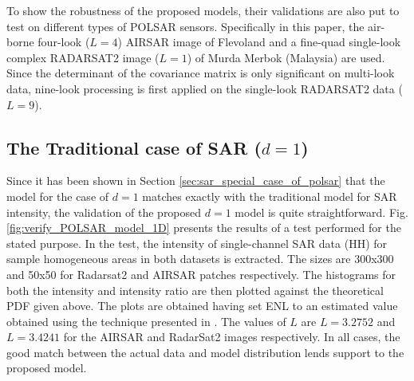\documentclass[journal]{IEEEtran}
\begin{document}
To show the robustness of the proposed models, 
  their validations are also put to test on different types of POLSAR sensors.
Specifically in this paper, the air-borne four-look ($L=4$) AIRSAR image of Flevoland and
  a fine-quad single-look complex RADARSAT2 image ($L=1$) of Murda Merbok (Malaysia) are used.
Since the determinant of the covariance matrix is only significant on multi-look data,
  nine-look processing is first applied on the single-look RADARSAT2 data ($L=9$).

\subsection{The Traditional case of SAR ($d=1$)}

Since it has been shown in Section \ref{sec:sar_special_case_of_polsar} that the model for the case of $d=1$ matches exactly with the traditional model for SAR intensity,
  the validation of the proposed $d=1$ model is quite straightforward. %
Fig. \ref{fig:verify_POLSAR_model_1D} presents the results of a test performed for the stated purpose.
In the test, the intensity of single-channel SAR data (HH) for sample homogeneous areas in both datasets is extracted.
The sizes are 300x300 and 50x50 for Radarsat2 and AIRSAR patches respectively. 
The histograms for both the intensity and intensity ratio %
  are then plotted against the theoretical PDF given above.
The plots are obtained having set ENL to an estimated value obtained using the technique presented in \cite{Anfinsen_2009_TGRS_3795}.
The values of $L$ are $L=3.2752$ and $L=3.4241$ for the AIRSAR and RadarSat2 images respectively.   
In all cases, the good match between the actual data and model distribution lends support to the proposed model. %
\end{document}
